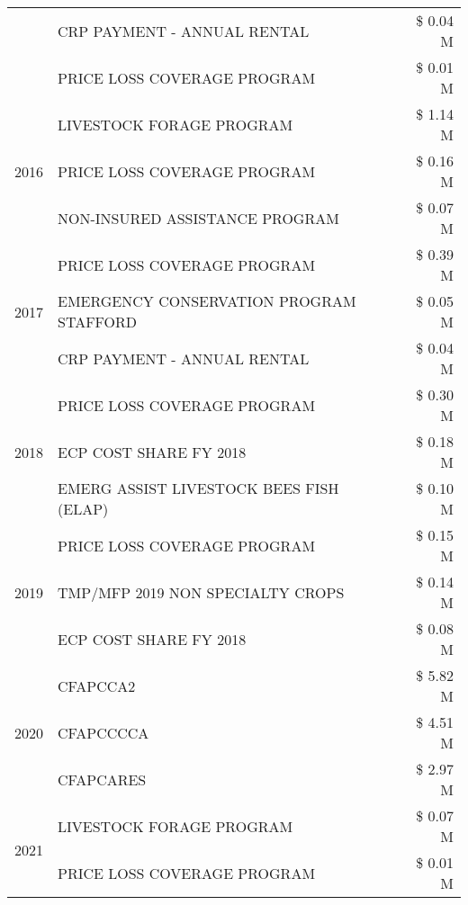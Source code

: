 \begin{tabular}{llr}
 & CRP PAYMENT - ANNUAL RENTAL & \$ 0.04 M \\
 & PRICE LOSS COVERAGE PROGRAM & \$ 0.01 M \\
\cline{1-3}
\multirow[t]{3}{*}{2016} & LIVESTOCK FORAGE PROGRAM & \$ 1.14 M \\
 & PRICE LOSS COVERAGE PROGRAM & \$ 0.16 M \\
 & NON-INSURED ASSISTANCE PROGRAM & \$ 0.07 M \\
\cline{1-3}
\multirow[t]{3}{*}{2017} & PRICE LOSS COVERAGE PROGRAM & \$ 0.39 M \\
 & EMERGENCY CONSERVATION PROGRAM STAFFORD & \$ 0.05 M \\
 & CRP PAYMENT - ANNUAL RENTAL & \$ 0.04 M \\
\cline{1-3}
\multirow[t]{3}{*}{2018} & PRICE LOSS COVERAGE PROGRAM & \$ 0.30 M \\
 & ECP COST SHARE FY 2018 & \$ 0.18 M \\
 & EMERG ASSIST LIVESTOCK BEES FISH (ELAP) & \$ 0.10 M \\
\cline{1-3}
\multirow[t]{3}{*}{2019} & PRICE LOSS COVERAGE PROGRAM & \$ 0.15 M \\
 & TMP/MFP 2019 NON SPECIALTY CROPS & \$ 0.14 M \\
 & ECP COST SHARE FY 2018 & \$ 0.08 M \\
\cline{1-3}
\multirow[t]{3}{*}{2020} & CFAPCCA2 & \$ 5.82 M \\
 & CFAPCCCCA & \$ 4.51 M \\
 & CFAPCARES & \$ 2.97 M \\
\cline{1-3}
\multirow[t]{2}{*}{2021} & LIVESTOCK FORAGE PROGRAM & \$ 0.07 M \\
 & PRICE LOSS COVERAGE PROGRAM & \$ 0.01 M \\
\cline{1-3}
\bottomrule
\end{tabular}
